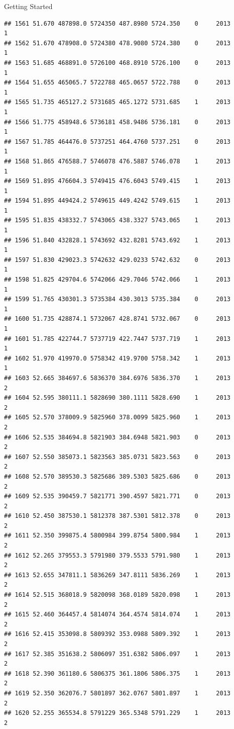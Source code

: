 \documentclass[
  ignorenonframetext,
]{beamer}
\begin{document}
\begin{frame}[fragile]{Getting Started}
\begin{verbatim}
## 1561 51.670 487898.0 5724350 487.8980 5724.350    0     2013        1
## 1562 51.670 478908.0 5724380 478.9080 5724.380    0     2013        1
## 1563 51.685 468891.0 5726100 468.8910 5726.100    0     2013        1
## 1564 51.655 465065.7 5722788 465.0657 5722.788    0     2013        1
## 1565 51.735 465127.2 5731685 465.1272 5731.685    1     2013        1
## 1566 51.775 458948.6 5736181 458.9486 5736.181    0     2013        1
## 1567 51.785 464476.0 5737251 464.4760 5737.251    0     2013        1
## 1568 51.865 476588.7 5746078 476.5887 5746.078    1     2013        1
## 1569 51.895 476604.3 5749415 476.6043 5749.415    1     2013        1
## 1594 51.895 449424.2 5749615 449.4242 5749.615    1     2013        1
## 1595 51.835 438332.7 5743065 438.3327 5743.065    1     2013        1
## 1596 51.840 432828.1 5743692 432.8281 5743.692    1     2013        1
## 1597 51.830 429023.3 5742632 429.0233 5742.632    0     2013        1
## 1598 51.825 429704.6 5742066 429.7046 5742.066    1     2013        1
## 1599 51.765 430301.3 5735384 430.3013 5735.384    0     2013        1
## 1600 51.735 428874.1 5732067 428.8741 5732.067    0     2013        1
## 1601 51.785 422744.7 5737719 422.7447 5737.719    1     2013        1
## 1602 51.970 419970.0 5758342 419.9700 5758.342    1     2013        1
## 1603 52.665 384697.6 5836370 384.6976 5836.370    1     2013        2
## 1604 52.595 380111.1 5828690 380.1111 5828.690    1     2013        2
## 1605 52.570 378009.9 5825960 378.0099 5825.960    1     2013        2
## 1606 52.535 384694.8 5821903 384.6948 5821.903    0     2013        2
## 1607 52.550 385073.1 5823563 385.0731 5823.563    0     2013        2
## 1608 52.570 389530.3 5825686 389.5303 5825.686    0     2013        2
## 1609 52.535 390459.7 5821771 390.4597 5821.771    0     2013        2
## 1610 52.450 387530.1 5812378 387.5301 5812.378    0     2013        2
## 1611 52.350 399875.4 5800984 399.8754 5800.984    1     2013        2
## 1612 52.265 379553.3 5791980 379.5533 5791.980    1     2013        2
## 1613 52.655 347811.1 5836269 347.8111 5836.269    1     2013        2
## 1614 52.515 368018.9 5820098 368.0189 5820.098    1     2013        2
## 1615 52.460 364457.4 5814074 364.4574 5814.074    1     2013        2
## 1616 52.415 353098.8 5809392 353.0988 5809.392    1     2013        2
## 1617 52.385 351638.2 5806097 351.6382 5806.097    1     2013        2
## 1618 52.390 361180.6 5806375 361.1806 5806.375    1     2013        2
## 1619 52.350 362076.7 5801897 362.0767 5801.897    1     2013        2
## 1620 52.255 365534.8 5791229 365.5348 5791.229    1     2013        2

\end{verbatim}
\end{frame}
\end{document}
